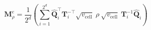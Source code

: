 \begin{equation}
    \mathbf{M}^e_{\rho} =
    \frac{1}{2^d}
    \left(\sum_{i=1}^{2^d}
        \mathbf{\hat{Q}}_i^{\top} \mathbf{T}_i^{-\top} \sqrt{v_{\text{cell}}}
            ~ \rho ~
        \sqrt{v_{\text{cell}}}  ~ \mathbf{T}_i^{-1} \mathbf{\hat{Q}}_i
    \right)
\end{equation}
